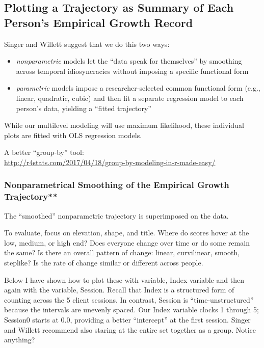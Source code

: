 \documentclass[
  11pt,
]{book}
\providecommand{\tightlist}{%
  \setlength{\itemsep}{0pt}\setlength{\parskip}{0pt}}
\begin{document}
\hypertarget{plotting-a-trajectory-as-summary-of-each-persons-empirical-growth-record}{%
\subsection{Plotting a Trajectory as Summary of Each Person's Empirical Growth Record}\label{plotting-a-trajectory-as-summary-of-each-persons-empirical-growth-record}}

Singer and Willett \citeyearpar{singer_applied_2003} suggest that we do this two ways:

\begin{itemize}
\tightlist
\item
  \emph{nonparametric} models let the ``data speak for themselves'' by smoothing across temporal idiosyncracies without imposing a specific functional form
\item
  \emph{parametric} models impose a researcher-selected common functional form (e.g., linear, quadratic, cubic) and then fit a separate regression model to each person's data, yielding a ``fitted trajectory''
\end{itemize}

While our multilevel modeling will use maximum likelihood, these individual plots are fitted with OLS regression models.

A better ``group-by'' tool:\\
\url{http://r4stats.com/2017/04/18/group-by-modeling-in-r-made-easy/}

\hypertarget{nonparametrical-smoothing-of-the-empirical-growth-trajectory}{%
\subsubsection{Nonparametrical Smoothing of the Empirical Growth Trajectory**}\label{nonparametrical-smoothing-of-the-empirical-growth-trajectory}}

The ``smoothed'' nonparametric trajectory is superimposed on the data.

To evaluate, focus on elevation, shape, and title. Where do scores hover at the low, medium, or high end? Does everyone change over time or do some remain the same? Is there an overall pattern of change: linear, curvilinear, smooth, steplike? Is the rate of change similar or different across people.

Below I have shown how to plot these with variable, Index variable and then again with the variable, Session. Recall that Index is a structured form of counting across the 5 client sessions. In contrast, Session is ``time-unstructured'' because the intervals are unevenly spaced. Our Index variable clocks 1 through 5; Session0 starts at 0.0, providing a better ``intercept'' at the first session. Singer and Willett \citeyearpar{singer_applied_2003} recommend also staring at the entire set together as a group. Notice anything?
\end{document}
